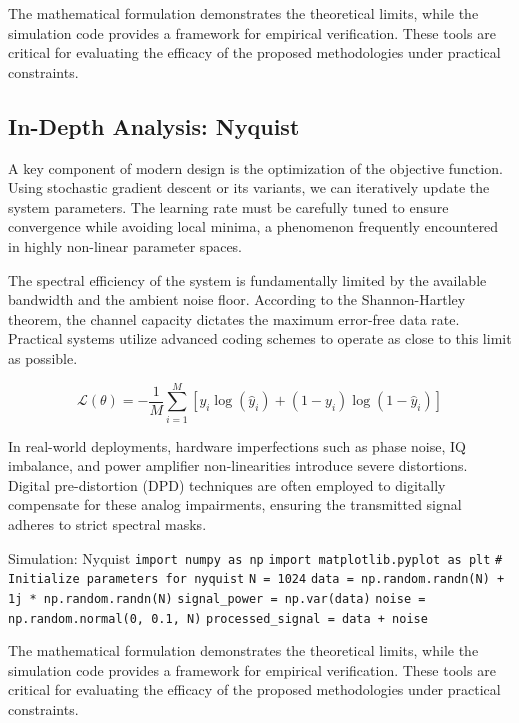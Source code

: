 \vspace{0.5cm}
The mathematical formulation demonstrates the theoretical limits, while the simulation code provides a framework for empirical verification. These tools are critical for evaluating the efficacy of the proposed methodologies under practical constraints.


\subsection{In-Depth Analysis: Nyquist}
A key component of modern design is the optimization of the objective function. Using stochastic gradient descent or its variants, we can iteratively update the system parameters. The learning rate must be carefully tuned to ensure convergence while avoiding local minima, a phenomenon frequently encountered in highly non-linear parameter spaces.

The spectral efficiency of the system is fundamentally limited by the available bandwidth and the ambient noise floor. According to the Shannon-Hartley theorem, the channel capacity dictates the maximum error-free data rate. Practical systems utilize advanced coding schemes to operate as close to this limit as possible.

\begin{equation}
    \mathcal{L}(\theta) = -\frac{1}{M} \sum_{i=1}^{M} \left[ y_i \log(\hat{y}_i) + (1-y_i)\log(1-\hat{y}_i) \right]
\end{equation}

In real-world deployments, hardware imperfections such as phase noise, IQ imbalance, and power amplifier non-linearities introduce severe distortions. Digital pre-distortion (DPD) techniques are often employed to digitally compensate for these analog impairments, ensuring the transmitted signal adheres to strict spectral masks.

\begin{pythonbox}{Simulation: Nyquist}
\texttt{import numpy as np}
\texttt{import matplotlib.pyplot as plt}
\texttt{}
\texttt{\# Initialize parameters for nyquist}
\texttt{N = 1024}
\texttt{data = np.random.randn(N) + 1j * np.random.randn(N)}
\texttt{signal\_power = np.var(data)}
\texttt{noise = np.random.normal(0, 0.1, N)}
\texttt{processed\_signal = data + noise}
\end{pythonbox}

\vspace{0.5cm}
The mathematical formulation demonstrates the theoretical limits, while the simulation code provides a framework for empirical verification. These tools are critical for evaluating the efficacy of the proposed methodologies under practical constraints.

